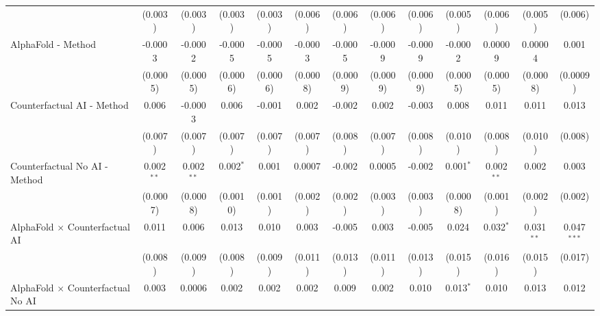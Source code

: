 \begin{tabular}{lcccccccccccc}
                                                              & (0.003)        & (0.003)        & (0.003)        & (0.003)       & (0.006)  & (0.006)  & (0.006)  & (0.006)  & (0.005)        & (0.006)       & (0.005)        & (0.006)\\   
   AlphaFold - Method                                         & -0.0003        & -0.0002        & -0.0005        & -0.0005       & -0.0003  & -0.0005  & -0.0009  & -0.0009  & -0.0002        & 0.00009       & 0.00004        & 0.001\\   
                                                              & (0.0005)       & (0.0005)       & (0.0006)       & (0.0006)      & (0.0008) & (0.0009) & (0.0009) & (0.0009) & (0.0005)       & (0.0005)      & (0.0008)       & (0.0009)\\   
   Counterfactual AI - Method                                 & 0.006          & -0.0003        & 0.006          & -0.001        & 0.002    & -0.002   & 0.002    & -0.003   & 0.008          & 0.011         & 0.011          & 0.013\\   
                                                              & (0.007)        & (0.007)        & (0.007)        & (0.007)       & (0.007)  & (0.008)  & (0.007)  & (0.008)  & (0.010)        & (0.008)       & (0.010)        & (0.008)\\   
   Counterfactual No AI - Method                              & 0.002$^{**}$   & 0.002$^{**}$   & 0.002$^{*}$    & 0.001         & 0.0007   & -0.002   & 0.0005   & -0.002   & 0.001$^{*}$    & 0.002$^{**}$  & 0.002          & 0.003\\   
                                                              & (0.0007)       & (0.0008)       & (0.0010)       & (0.001)       & (0.002)  & (0.002)  & (0.003)  & (0.003)  & (0.0008)       & (0.001)       & (0.002)        & (0.002)\\   
   AlphaFold $\times$ Counterfactual AI                       & 0.011          & 0.006          & 0.013          & 0.010         & 0.003    & -0.005   & 0.003    & -0.005   & 0.024          & 0.032$^{*}$   & 0.031$^{**}$   & 0.047$^{***}$\\   
                                                              & (0.008)        & (0.009)        & (0.008)        & (0.009)       & (0.011)  & (0.013)  & (0.011)  & (0.013)  & (0.015)        & (0.016)       & (0.015)        & (0.017)\\   
   AlphaFold $\times$ Counterfactual No AI                    & 0.003          & 0.0006         & 0.002          & 0.002         & 0.002    & 0.009    & 0.002    & 0.010    & 0.013$^{*}$    & 0.010         & 0.013          & 0.012\\   

\end{tabular}
